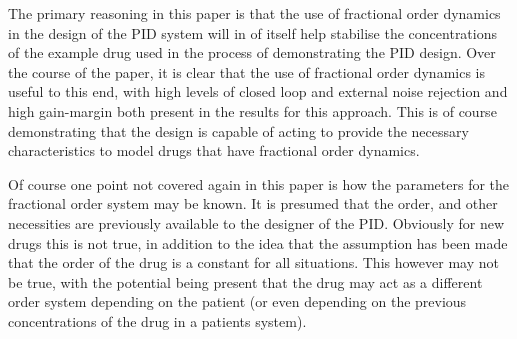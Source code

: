 The primary reasoning in this paper is that the use of fractional order dynamics in the design of the PID system will in of itself help stabilise the concentrations of the example drug used in the process of demonstrating the PID design. Over the course of the paper, it is clear that the use of fractional order dynamics is useful to this end, with high levels of closed loop and external noise rejection and high gain-margin both present in the results for this approach. This is of course demonstrating that the design is capable of acting to provide the necessary characteristics to model drugs that have fractional order dynamics.

Of course one point not covered again in this paper is how the parameters for the fractional order system may be known. It is presumed that the order, and other necessities are previously available to the designer of the PID. Obviously for new drugs this is not true, in addition to the idea that the assumption has been made that the order of the drug is a constant for all situations. This however may not be true, with the potential being present that the drug may act as a different order system depending on the patient (or even depending on the previous concentrations of the drug in a patients system). 
